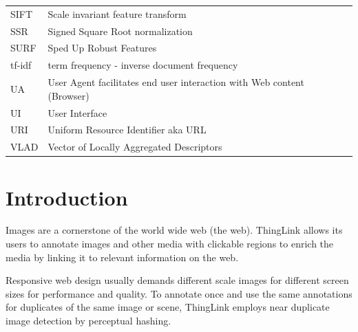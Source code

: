 \documentclass[english,12pt,a4paper,pdftex,elec,utf8]{aaltothesis}
\begin{document}
\begin{tabular}{ll}
  SIFT & Scale invariant feature transform \\
  SSR & Signed Square Root normalization\\
  SURF & Sped Up Robust Features \\
  tf-idf & term frequency - inverse document frequency\\
  UA   & User Agent facilitates end user interaction with Web content (Browser)\\
  UI   & User Interface\\
  URI  & Uniform Resource Identifier aka URL\\
  VLAD & Vector of Locally Aggregated Descriptors\\
\end{tabular}

\cleardoublepage
\storeinipagenumber
{}
\setcounter{page}{1}


\section{Introduction}

\thispagestyle{empty}

Images are a cornerstone of the world wide web (the web). ThingLink allows its users to annotate images and other media with clickable regions to enrich the media by linking it to relevant information on the web.

Responsive web design usually demands different scale images for different screen sizes for performance and quality. To annotate once and use the same annotations for duplicates of the same image or scene, ThingLink employs near duplicate image detection by perceptual hashing.
\end{document}
